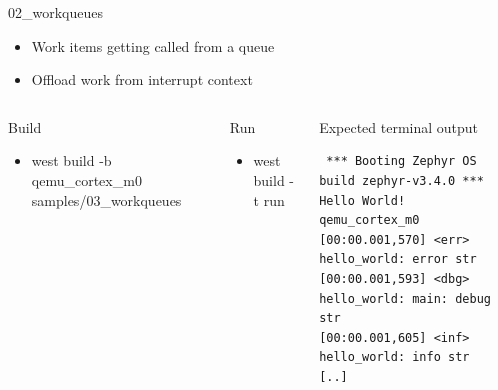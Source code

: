 \documentclass[10pt, aspectratio=169]{beamer}
\begin{document}
\begin{frame}[fragile]{02\_workqueues}

  \begin{itemize}
     \item Work items getting called from a queue
     \item Offload work from interrupt context
  \end{itemize}

  \begin{columns}[T,onlytextwidth]
      \begin{block}{Build}
        \begin{itemize}
          \item {\scriptsize west build -b qemu\_cortex\_m0 samples/03\_workqueues}
        \end{itemize}
      \end{block}

     \begin{block}{Run}
        \begin{itemize}
          \item {\scriptsize west build -t run}
        \end{itemize}
      \end{block}



      \begin{exampleblock}{Expected terminal output}

        {\fontsize{6}{9.6}\selectfont
          \begin{verbatim}
 *** Booting Zephyr OS build zephyr-v3.4.0 ***
Hello World! qemu_cortex_m0
[00:00.001,570] <err> hello_world: error str
[00:00.001,593] <dbg> hello_world: main: debug str
[00:00.001,605] <inf> hello_world: info str
[..]
          \end{verbatim}
        }
      \end{exampleblock}
  \end{columns}
\end{frame}
\end{document}
